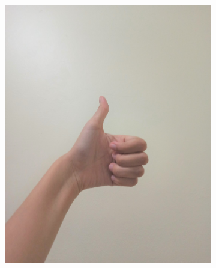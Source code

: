 \documentclass[conference]{IEEEtran}
\begin{document}
\begin{figure} [h]
\begin{center}
\begin{subfigure}[t]{0.11\textwidth}
			\includegraphics[width=\textwidth]{img/pola8c.jpg}
			\caption{\label{fig:gs8c}}
		\end{subfigure}
		\hspace{0.1em}
		\begin{subfigure}[t]{0.11\textwidth}
			\centering

\end{subfigure}
\end{center}
\end{figure}
\end{document}
